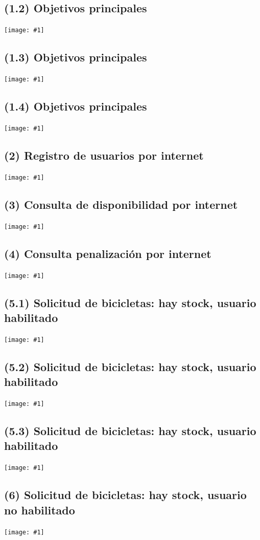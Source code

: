 \documentclass[a4paper, 10pt, twoside]{article}
\newcommand{\diagrama}[1]{
  \texttt{[image: \#1]}
}
\begin{document}
\subsection{(1.2)  Objetivos principales}
\diagrama{objetivos-1.2}

\subsection{(1.3)  Objetivos principales}
\diagrama{objetivos-1.3}

\subsection{(1.4)  Objetivos principales}
\diagrama{objetivos-1.4}

\subsection{(2)    Registro de usuarios por internet}
\diagrama{objetivos-2}

\subsection{(3)    Consulta de disponibilidad por internet}
\diagrama{objetivos-3}

\subsection{(4)    Consulta penalización por internet}
\diagrama{objetivos-4}

\subsection{(5.1)  Solicitud de bicicletas: hay stock, usuario habilitado}
\diagrama{objetivos-5.1}

\subsection{(5.2)  Solicitud de bicicletas: hay stock, usuario habilitado}
\diagrama{objetivos-5.2}

\subsection{(5.3)  Solicitud de bicicletas: hay stock, usuario habilitado}
\diagrama{objetivos-5.3}

\subsection{(6)    Solicitud de bicicletas: hay stock, usuario no habilitado}
\diagrama{objetivos-6}
\end{document}
